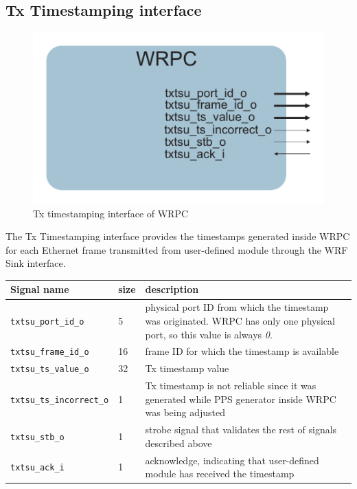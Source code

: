 \subsection{Tx Timestamping interface}
\label{sec:txts}

\begin{figure}[ht]
  \begin{center}
    \includegraphics[width=.4\textwidth]{fig/wrpc_txts.pdf}
    \caption{Tx timestamping interface of WRPC}
  \end{center}
\end{figure}

The Tx Timestamping interface provides the timestamps generated inside WRPC for each
Ethernet frame transmitted from user-defined module through the WRF Sink interface.\\

\begin{center}
  \begin{tabular}{|l|l|p{9cm}|}
    \hline
    {\bf Signal name} & {\bf size} & {\bf description} \\
    \hline \hline
    \texttt{txtsu\_port\_id\_o} & 5 & physical port ID from which the timestamp
    was originated. WRPC has only one physical port, so this value is always
    \emph{0}.\\
    \texttt{txtsu\_frame\_id\_o} & 16 & frame ID for which the timestamp is
    available\\
    \texttt{txtsu\_ts\_value\_o} & 32 & Tx timestamp value\\
    \texttt{txtsu\_ts\_incorrect\_o} & 1 & Tx timestamp is not reliable since it
    was generated while PPS generator inside WRPC was being adjusted\\
    \texttt{txtsu\_stb\_o} & 1 & strobe signal that validates the rest of signals
    described above\\
    \texttt{txtsu\_ack\_i} & 1 & acknowledge, indicating that user-defined module
    has received the timestamp\\
    \hline
  \end{tabular}
\end{center}
